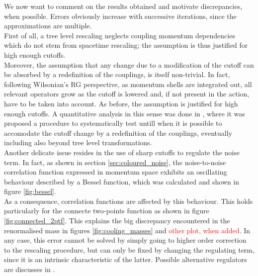 We now want to comment on the results obtained and motivate discrepancies, when possible. Errors obviously increase with successive iterations, since the approximations are multiple. \\
First of all, a tree level rescaling neglects coupling momentum dependencies which do not stem from spacetime rescaling; the assumption is thus justified for high enough cutoffs.  \\
Moreover, the assumption that any change due to a modification of the cutoff can be absorbed by a redefinition of the couplings, is itself non-trivial. In fact, following Wilsonian's RG perspective, as momentum shells are integrated out, 
all relevant operators grow as the cutoff is lowered and, if not present in the action, have to be taken into account. As before, the assumption is justified for high enough cutoffs. A quantitative analysis in this sense was done in \cite{Pawlowski2017CoolingNoise}, where it was proposed a procedure to 
systematically test untill when it is possible to accomodate the cutoff change by a redefinition of the couplings, eventually including also beyond tree level transformations. \\
Another delicate issue resides in the use of sharp cutoffs to regulate the noise term. In fact, as shown in section \ref{sec:coloured_noise}, the noise-to-noise correlation function expressed in momentum space exhibits an oscillating behaviour described by a Bessel function, which was calculated and shown in figure \ref{fig:bessel}. \\
As a consequence, correlation functions are affected by this behaviour. This holds particularly for the connecte two-points function as shown in figure \ref{fig:connected_2ptf}. This explains the big discrepancy encountered in the renormalised mass in figures \ref{fig:cooling_masses} and \textcolor{red}{other plot, when added}. In any case, this error cannot be solved
by simply going to higher order correction to the rescaling procedure, but can only be fixed by changing the regulating term, since it is an intrinsic characteristic of the latter. Possible alternative regulators are discusses in \cite{Pawlowski2017CoolingNoise}.
